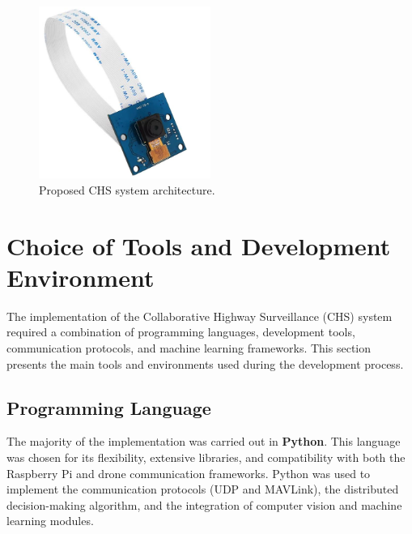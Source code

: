 \begin{figure}[H]  
    \centering
    \includegraphics[width=0.5\textwidth]{Figures/Chapter5/Section2/camera.png} %
    \caption{Proposed CHS system architecture.}
    \label{fig:proposed_architecture} %
\end{figure}

\section{Choice of Tools and Development Environment}

The implementation of the Collaborative Highway Surveillance (CHS) system required a 
combination of programming languages, development tools, communication protocols, 
and machine learning frameworks. This section presents the main tools and environments 
used during the development process.

\subsection*{Programming Language}
The majority of the implementation was carried out in \textbf{Python}. This language was chosen 
for its flexibility, extensive libraries, and compatibility with both the Raspberry Pi and 
drone communication frameworks. Python was used to implement the communication 
protocols (UDP and MAVLink), the distributed decision-making algorithm, and 
the integration of computer vision and machine learning modules. 

